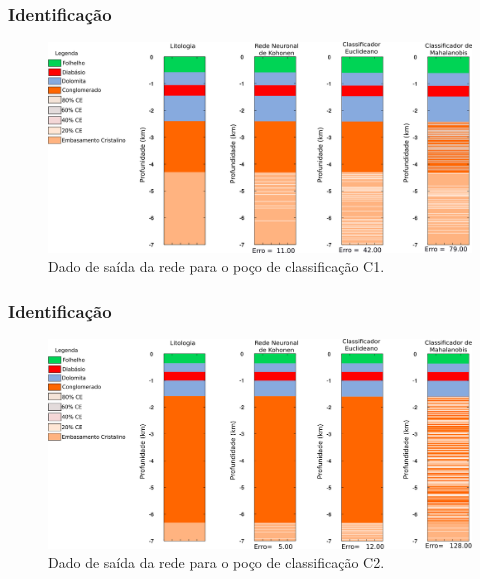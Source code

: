 \documentclass[aspectratio=10]{beamer} %
\begin{document}

\begin{frame}
\frametitle{Identificação}
\begin{figure}[H]
\centering
\includegraphics[scale=0.3]{Imagens/IDC1020118.png}
\caption{Dado de saída da rede para o poço de classificação C1.}
\label{Class C1}
\end{figure} 
\end{frame}

\begin{frame}
\frametitle{Identificação}
\begin{figure}[H]
\centering
\includegraphics[scale=0.3]{Imagens/IDC2020118.png}
\caption{Dado de saída da rede para o poço de classificação C2.}
\label{Class C2}
\end{figure} 
\end{frame}
\end{document}
